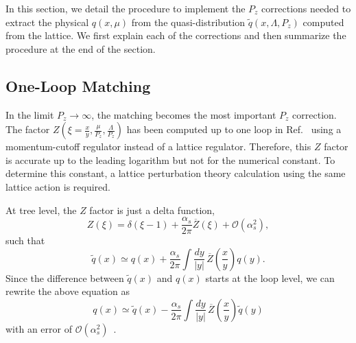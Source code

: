 
In this section, we detail the procedure to implement the $P_z$ corrections
needed to extract the physical $q(x,\mu)$ from the quasi-distribution
$\tilde{q}(x,\Lambda,P_z)$ computed from the lattice. We first explain each of the
corrections and then summarize the procedure at the end of the section.

\subsection{One-Loop Matching}

In the limit $P_z \rightarrow \infty$, the matching becomes the most
important $P_z$ correction. The factor
$Z\left(\xi=\frac{x}{y},\frac{\mu}{P_z},\frac{\Lambda}{P_z}\right)$
has been computed up to one loop in
Ref.~\cite{Xiong:2013bka} using a momentum-cutoff regulator instead of a
lattice regulator. Therefore, this $Z$ factor is accurate up to the
leading logarithm but not for the numerical constant. To determine this
constant, a lattice perturbation theory calculation using the same lattice
action is required.

At tree level, the $Z$ factor is just a delta function,
%
\begin{equation}
Z(\xi) = \delta (\xi-1) + \frac{\alpha_s}{2\pi} \overline{Z}(\xi)
  + \mathcal{O}\left(\alpha_s^2 \right),
\end{equation}
%
such that
%
\begin{equation}
\widetilde{q}(x) \simeq q(x)
  + \frac{\alpha_s}{2\pi} \int \frac{dy}{\left\vert y\right\vert}\,
    \overline{Z}\!\left(\frac{x}{y}\right)q(y).
\end{equation}
%
Since the difference between $\widetilde{q}(x)$ and $q(x)$ starts at
the loop level, we can rewrite the above equation as
%
\begin{equation}
q(x) \simeq \widetilde{q}(x)
  - \frac{\alpha_s}{2\pi} \int \frac{dy}{\left\vert y\right\vert}\,
    \overline{Z}\!\left(\frac{x}{y}\right)\widetilde{q}(y)
\label{q}
\end{equation}
%
with an error of $\mathcal{O}\left(\alpha_s^2\right)$~\cite{Ma:2014jla}.


